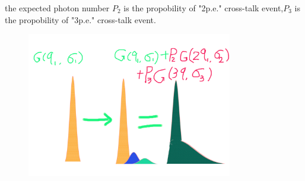 \documentclass[11pt,compress,xcolor=x11names,UTF8]{beamer}
\begin{document}
\begin{frame}{ the expected photon number}
	$P_2$ is the propobility of "2p.e." cross-talk event,$P_3$ is the propobility of "3p.e." cross-talk event. 
\begin{figure}
\centering
\includegraphics[width=0.8\textwidth]{figure/illust.png}
\end{figure}

\end{frame}
\end{document}
